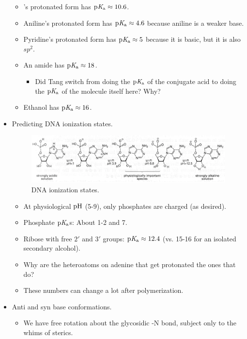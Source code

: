 \documentclass[../notes.tex]{subfiles}
\begin{document}
\begin{itemize}
    \begin{itemize}
        \item {}'s protonated form has $\operatorname{p\textit{K}_a}\approx 10.6$.
        \item Aniline's protonated form has $\operatorname{p\textit{K}_a}\approx 4.6$ because aniline is a weaker base.
        \item Pyridine's protonated form has $\operatorname{p\textit{K}_a}\approx 5$ because it is basic, but it is also $sp^2$.
        \item An amide has $\operatorname{p\textit{K}_a}\approx 18$.
        \begin{itemize}
            \item Did Tang switch from doing the $\operatorname{p\textit{K}_a}$ of the conjugate acid to doing the $\operatorname{p\textit{K}_a}$ of the molecule itself here? Why?
        \end{itemize}
        \item Ethanol has $\operatorname{p\textit{K}_a}\approx 16$.
    \end{itemize}
    \item Predicting DNA ionization states.
    \begin{figure}[h!]
        \centering
        \includegraphics[width=0.9\linewidth]{../ExtFiles/dnaIonization.png}
        \caption{DNA ionization states.}
        \label{fig:dnaIonization}
    \end{figure}
    \begin{itemize}
        \item At physiological $\operatorname{pH}$ (5-9), only phosphates are charged (as desired).
        \item Phosphate $\operatorname{p\textit{K}_a}$s: About 1-2 and 7.
        \item Ribose with free $2'$ and $3'$  groups: $\operatorname{p\textit{K}_a}\approx 12.4$ (vs. 15-16 for an isolated secondary alcohol).
        \item Why are the heteroatoms on adenine that get protonated the ones that do?
        \item These numbers can change a lot after polymerization.
    \end{itemize}
    \item Anti and syn base conformations.
    \begin{itemize}
        \item We have free rotation about the glycosidic -N bond, subject only to the whims of sterics.

\end{itemize}
\end{itemize}
\end{document}
